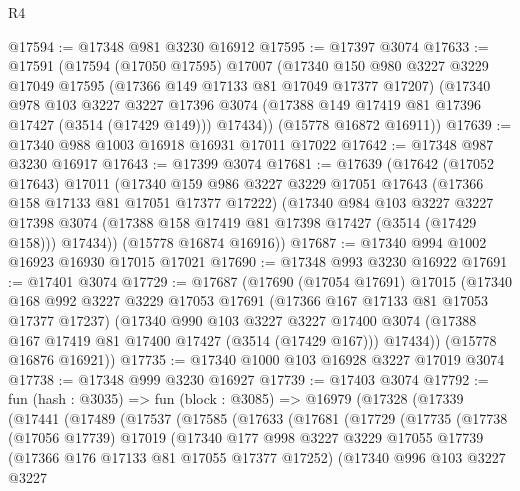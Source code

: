\begin{lexlean}{R4}
\begin{coremodule}
@17594 := @17348 @981 @3230 @16912
@17595 := @17397 @3074
@17633 := @17591
    (@17594
      (@17050 @17595)
      @17007
      (@17340
        @150
        @980
        @3227
        @3229
        @17049
        @17595
        (@17366 @149 @17133 @81 @17049 @17377 @17207)
        (@17340
          @978
          @103
          @3227
          @3227
          @17396
          @3074
          (@17388 @149 @17419 @81 @17396 @17427 (@3514 (@17429 @149)))
          @17434))
      (@15778 @16872 @16911))
@17639 := @17340 @988 @1003 @16918 @16931 @17011 @17022
@17642 := @17348 @987 @3230 @16917
@17643 := @17399 @3074
@17681 := @17639
    (@17642
      (@17052 @17643)
      @17011
      (@17340
        @159
        @986
        @3227
        @3229
        @17051
        @17643
        (@17366 @158 @17133 @81 @17051 @17377 @17222)
        (@17340
          @984
          @103
          @3227
          @3227
          @17398
          @3074
          (@17388 @158 @17419 @81 @17398 @17427 (@3514 (@17429 @158)))
          @17434))
      (@15778 @16874 @16916))
@17687 := @17340 @994 @1002 @16923 @16930 @17015 @17021
@17690 := @17348 @993 @3230 @16922
@17691 := @17401 @3074
@17729 := @17687
    (@17690
      (@17054 @17691)
      @17015
      (@17340
        @168
        @992
        @3227
        @3229
        @17053
        @17691
        (@17366 @167 @17133 @81 @17053 @17377 @17237)
        (@17340
          @990
          @103
          @3227
          @3227
          @17400
          @3074
          (@17388 @167 @17419 @81 @17400 @17427 (@3514 (@17429 @167)))
          @17434))
      (@15778 @16876 @16921))
@17735 := @17340 @1000 @103 @16928 @3227 @17019 @3074
@17738 := @17348 @999 @3230 @16927
@17739 := @17403 @3074
@17792 := fun (hash : @3035) =>
  fun (block : @3085) =>
  @16979
    (@17328
      (@17339
        (@17441
          (@17489
            (@17537
              (@17585
                (@17633
                  (@17681
                    (@17729
                      (@17735
                        (@17738
                          (@17056 @17739)
                          @17019
                          (@17340
                            @177
                            @998
                            @3227
                            @3229
                            @17055
                            @17739
                            (@17366 @176 @17133 @81 @17055 @17377 @17252)
                            (@17340
                              @996
                              @103
                              @3227
                              @3227

\end{coremodule}
\end{lexlean}
